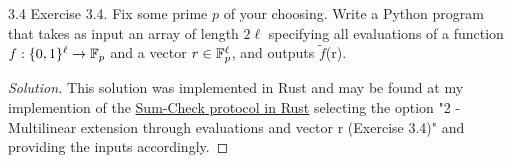 \begin{exercise}{3.4}\label{ex:3.4}
    Exercise 3.4. Fix some prime $p$ of your choosing. Write a Python program that takes as input an array of length $2\ell$ specifying all evaluations of a function $f : \{0,1\}^\ell \to \mathbb{F}_p$ and a vector $r \in \mathbb{F}_p^\ell$, and outputs $\tilde{f}$(r).
\end{exercise}

\begin{proof}[Solution]
    This solution was implemented in Rust and may be found at my implemention of the \href{https://github.com/ctrldimatiaz/sumcheck}{Sum-Check protocol in Rust} selecting the option "2 - Multilinear extension through evaluations and vector r (Exercise 3.4)" and providing the inputs accordingly.
\end{proof}

